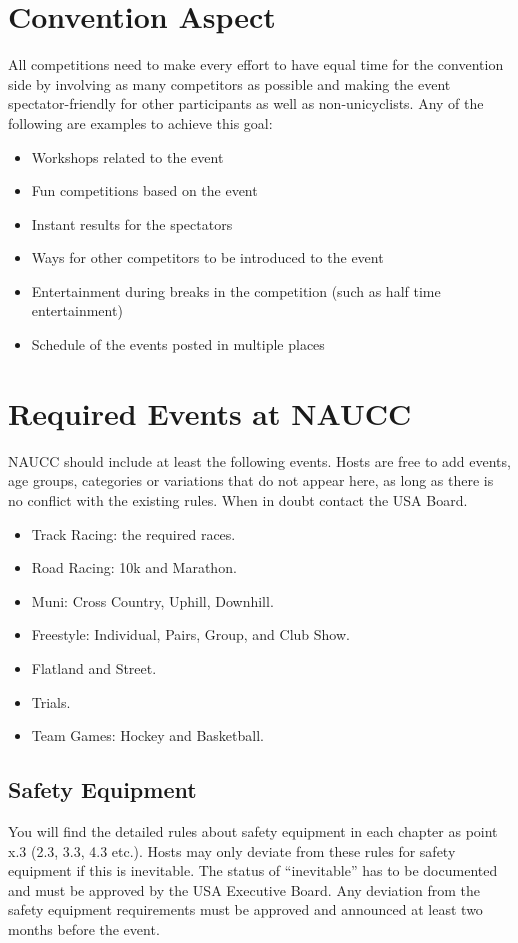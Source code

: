 \section{Convention Aspect}
All competitions need to make every effort to have equal time for the convention side by involving as many competitors as possible and making the event spectator-friendly for other participants as well as non-unicyclists.
Any of the following are examples to achieve this goal:
\begin{itemize}
  \item Workshops related to the event
  \item Fun competitions based on the event
  \item Instant results for the spectators
  \item Ways for other competitors to be introduced to the event
  \item Entertainment during breaks in the competition (such as half time entertainment)
  \item Schedule of the events posted in multiple places
\end{itemize}

\section{Required Events at NAUCC}
NAUCC should include at least the following events. 
Hosts are free to add events, age groups, categories or variations that do not appear here, as long as there is no conflict with the existing rules. 
When in doubt contact the USA Board.
\begin{itemize}
  \item Track Racing: the required races.
  \item Road Racing: 10k and Marathon.
   \item Muni: Cross Country, Uphill, Downhill.
   \item Freestyle: Individual, Pairs, Group, and Club Show.
   \item Flatland and Street.
   \item Trials.
  \item Team Games: Hockey and Basketball.
\end{itemize}

\subsection{Safety Equipment}
You will find the detailed rules about safety equipment in each chapter as point x.3 (2.3, 3.3, 4.3 etc.).
Hosts may only deviate from these rules for safety equipment if this is inevitable. The status of ``inevitable'' has to be documented and must be approved by the USA Executive Board. 
Any deviation from the safety equipment requirements must be approved and announced at least two months before the event.


